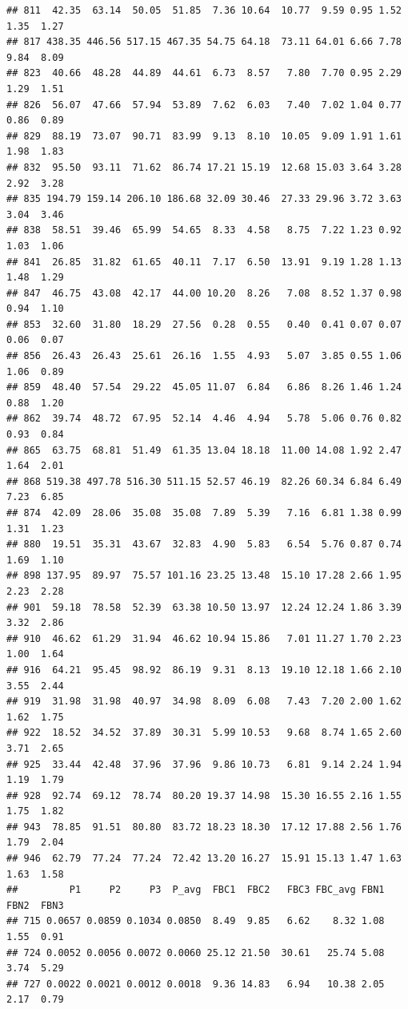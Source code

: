\documentclass[]{article}
\begin{document}
\begin{verbatim}
## 811  42.35  63.14  50.05  51.85  7.36 10.64  10.77  9.59 0.95 1.52  1.35  1.27
## 817 438.35 446.56 517.15 467.35 54.75 64.18  73.11 64.01 6.66 7.78  9.84  8.09
## 823  40.66  48.28  44.89  44.61  6.73  8.57   7.80  7.70 0.95 2.29  1.29  1.51
## 826  56.07  47.66  57.94  53.89  7.62  6.03   7.40  7.02 1.04 0.77  0.86  0.89
## 829  88.19  73.07  90.71  83.99  9.13  8.10  10.05  9.09 1.91 1.61  1.98  1.83
## 832  95.50  93.11  71.62  86.74 17.21 15.19  12.68 15.03 3.64 3.28  2.92  3.28
## 835 194.79 159.14 206.10 186.68 32.09 30.46  27.33 29.96 3.72 3.63  3.04  3.46
## 838  58.51  39.46  65.99  54.65  8.33  4.58   8.75  7.22 1.23 0.92  1.03  1.06
## 841  26.85  31.82  61.65  40.11  7.17  6.50  13.91  9.19 1.28 1.13  1.48  1.29
## 847  46.75  43.08  42.17  44.00 10.20  8.26   7.08  8.52 1.37 0.98  0.94  1.10
## 853  32.60  31.80  18.29  27.56  0.28  0.55   0.40  0.41 0.07 0.07  0.06  0.07
## 856  26.43  26.43  25.61  26.16  1.55  4.93   5.07  3.85 0.55 1.06  1.06  0.89
## 859  48.40  57.54  29.22  45.05 11.07  6.84   6.86  8.26 1.46 1.24  0.88  1.20
## 862  39.74  48.72  67.95  52.14  4.46  4.94   5.78  5.06 0.76 0.82  0.93  0.84
## 865  63.75  68.81  51.49  61.35 13.04 18.18  11.00 14.08 1.92 2.47  1.64  2.01
## 868 519.38 497.78 516.30 511.15 52.57 46.19  82.26 60.34 6.84 6.49  7.23  6.85
## 874  42.09  28.06  35.08  35.08  7.89  5.39   7.16  6.81 1.38 0.99  1.31  1.23
## 880  19.51  35.31  43.67  32.83  4.90  5.83   6.54  5.76 0.87 0.74  1.69  1.10
## 898 137.95  89.97  75.57 101.16 23.25 13.48  15.10 17.28 2.66 1.95  2.23  2.28
## 901  59.18  78.58  52.39  63.38 10.50 13.97  12.24 12.24 1.86 3.39  3.32  2.86
## 910  46.62  61.29  31.94  46.62 10.94 15.86   7.01 11.27 1.70 2.23  1.00  1.64
## 916  64.21  95.45  98.92  86.19  9.31  8.13  19.10 12.18 1.66 2.10  3.55  2.44
## 919  31.98  31.98  40.97  34.98  8.09  6.08   7.43  7.20 2.00 1.62  1.62  1.75
## 922  18.52  34.52  37.89  30.31  5.99 10.53   9.68  8.74 1.65 2.60  3.71  2.65
## 925  33.44  42.48  37.96  37.96  9.86 10.73   6.81  9.14 2.24 1.94  1.19  1.79
## 928  92.74  69.12  78.74  80.20 19.37 14.98  15.30 16.55 2.16 1.55  1.75  1.82
## 943  78.85  91.51  80.80  83.72 18.23 18.30  17.12 17.88 2.56 1.76  1.79  2.04
## 946  62.79  77.24  77.24  72.42 13.20 16.27  15.91 15.13 1.47 1.63  1.63  1.58
##         P1     P2     P3  P_avg  FBC1  FBC2   FBC3 FBC_avg FBN1  FBN2  FBN3
## 715 0.0657 0.0859 0.1034 0.0850  8.49  9.85   6.62    8.32 1.08  1.55  0.91
## 724 0.0052 0.0056 0.0072 0.0060 25.12 21.50  30.61   25.74 5.08  3.74  5.29
## 727 0.0022 0.0021 0.0012 0.0018  9.36 14.83   6.94   10.38 2.05  2.17  0.79

\end{verbatim}
\end{document}
